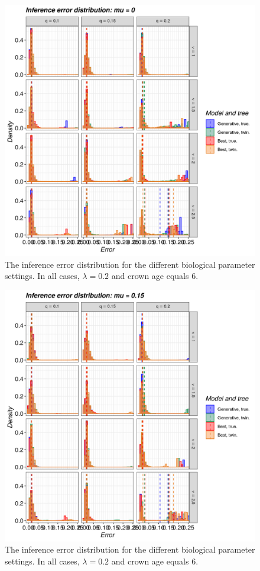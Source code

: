 \begin{figure}[!htbp]
  \includegraphics[width=\textwidth]{20190905_figure_1a.png}
  \caption{
    The inference error distribution 
    for the different biological
    parameter settings. In all cases, $\lambda = 0.2$ and 
    crown age equals 6. 
  }
  \label{fig:errors_yule}
\end{figure}

\begin{figure}[!htbp]
  \includegraphics[width=\textwidth]{20190905_figure_1b.png}
  \caption{
    The inference error distribution 
    for the different biological
    parameter settings. In all cases, $\lambda = 0.2$ and 
    crown age equals 6. 
  }
  \label{fig:errors_bd}
\end{figure}